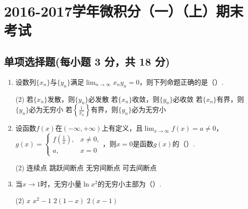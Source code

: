 \documentclass[../Main.tex]{subfiles}
\begin{document}
\chapter{2016-2017学年微积分（一）（上）期末考试}

\section{单项选择题(每小题 3 分，共 18 分)}
\begin{enumerate}
    \item 设数列$\{x_{n}\}$与$\{y_{n}\}$满足$\lim_{n\to\infty}x_{n} y_{n}=0$，则下列命题正确的是（\qquad）.

          \begin{tasks}[label=\textbf{\Alph*.}, label-width=1.5em, column-sep=1em](2)
              \task 若$\{x_{n}\}$发散，则$\{y_{n}\}$必发散
              \task 若$\{x_{n}\}$收敛，则$\{y_{n}\}$必收敛
              \task 若$\{x_{n}\}$有界，则$\{y_{n}\}$必为无穷小
              \task 若$\left\{\frac{1}{x_{n}}\right\}$有界，则$\{y_{n}\}$必为无穷小
          \end{tasks}
          \vspace{1em}

    \item 设函数$f(x)$在$(-\infty,+\infty)$上有定义，且$\lim_{x\to\infty}f(x)=a\neq
              0$，$g(x)=
              \begin{cases}
                  f\left(\frac{1}{x}\right), & x\neq0, \\
                  a,                         & x=0
              \end{cases}$，则$x=0$是函数$g(x)$的（\qquad）.

          \begin{tasks}[label=\textbf{\Alph*.}, label-width=1.5em, column-sep=1em](2)
              \task 连续点
              \task 跳跃间断点
              \task 无穷间断点
              \task 可去间断点
          \end{tasks}
          \vspace{1em}

    \item 当$x\to1$时，无穷小量$\ln x^{2}$的无穷小主部为（\qquad）.

          \begin{tasks}[label=\textbf{\Alph*.}, label-width=1.5em, column-sep=1em](2)
              \task $x$
              \task $x^{2}-1$
              \task $2(1-x)$
              \task $2(x-1)$
          \end{tasks}
          \vspace{1em}


\end{enumerate}
\end{document}
